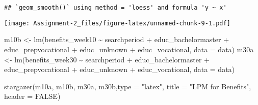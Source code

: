 \documentclass[
]{article}
\newenvironment{Shaded}{\begin{snugshade}}{\end{snugshade}}
\newcommand{\AttributeTok}[1]{\textcolor[rgb]{0.77,0.63,0.00}{#1}}
\newcommand{\ConstantTok}[1]{\textcolor[rgb]{0.00,0.00,0.00}{#1}}
\newcommand{\FunctionTok}[1]{\textcolor[rgb]{0.00,0.00,0.00}{#1}}
\newcommand{\NormalTok}[1]{#1}
\newcommand{\OtherTok}[1]{\textcolor[rgb]{0.56,0.35,0.01}{#1}}
\newcommand{\SpecialCharTok}[1]{\textcolor[rgb]{0.00,0.00,0.00}{#1}}
\newcommand{\StringTok}[1]{\textcolor[rgb]{0.31,0.60,0.02}{#1}}
\begin{document}
\begin{verbatim}
## `geom_smooth()` using method = 'loess' and formula 'y ~ x'
\end{verbatim}

\texttt{[image: Assignment-2\_files/figure-latex/unnamed-chunk-9-1.pdf]}

\begin{Shaded}
\begin{Highlighting}[]
\NormalTok{m10b }\OtherTok{\textless{}{-}} \FunctionTok{lm}\NormalTok{(benefits\_week10 }\SpecialCharTok{\textasciitilde{}}\NormalTok{ searchperiod }\SpecialCharTok{+}\NormalTok{ educ\_bachelormaster }\SpecialCharTok{+}\NormalTok{ educ\_prepvocational }\SpecialCharTok{+}\NormalTok{ educ\_unknown }\SpecialCharTok{+}\NormalTok{ educ\_vocational, }\AttributeTok{data =}\NormalTok{ data)}
\NormalTok{m30a }\OtherTok{\textless{}{-}} \FunctionTok{lm}\NormalTok{(benefits\_week30 }\SpecialCharTok{\textasciitilde{}}\NormalTok{ searchperiod }\SpecialCharTok{+}\NormalTok{ educ\_bachelormaster }\SpecialCharTok{+}\NormalTok{ educ\_prepvocational }\SpecialCharTok{+}\NormalTok{ educ\_unknown }\SpecialCharTok{+}\NormalTok{ educ\_vocational, }\AttributeTok{data =}\NormalTok{ data)}

\FunctionTok{stargazer}\NormalTok{(m10a, m10b, m30a, m30b,}\AttributeTok{type =} \StringTok{"latex"}\NormalTok{,}
         \AttributeTok{title =} \StringTok{"LPM for Benefits"}\NormalTok{, }\AttributeTok{header =} \ConstantTok{FALSE}\NormalTok{)}
\end{Highlighting}
\end{Shaded}
\end{document}
